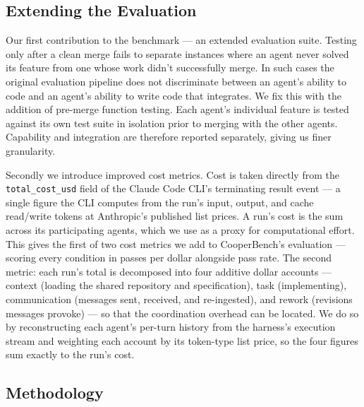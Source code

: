 \documentclass[11pt,a4paper]{article}
\begin{document}
\subsection{Extending the Evaluation}\label{sec:extendedeval}

Our first contribution to the benchmark --- an extended evaluation suite. Testing only after a clean merge fails to separate instances where an agent never solved its feature from one whose work didn't successfully merge. In such cases the original evaluation pipeline does not discriminate between an agent's ability to code and an agent's ability to write code that integrates. We fix this with the addition of pre-merge function testing. Each agent's individual feature is tested against its own test suite in isolation prior to merging with the other agents. Capability and integration are therefore reported separately, giving us finer granularity.

Secondly we introduce improved cost metrics. Cost is taken directly from the \texttt{total\_cost\_usd} field of the Claude Code CLI's terminating result event --- a single figure the CLI computes from the run's input, output, and cache read/write tokens at Anthropic's published list prices. A run's cost is the sum across its participating agents, which we use as a proxy for computational effort. This gives the first of two cost metrics we add to CooperBench's evaluation --- scoring every condition in passes per dollar alongside pass rate. The second metric: each run's total is decomposed into four additive dollar accounts --- context (loading the shared repository and specification), task (implementing), communication (messages sent, received, and re-ingested), and rework (revisions messages provoke) --- so that the coordination overhead can be located. We do so by reconstructing each agent's per-turn history from the harness's execution stream and weighting each account by its token-type list price, so the four figures sum exactly to the run's cost.


\subsection{Methodology}\label{sec:replmethod}
\end{document}
